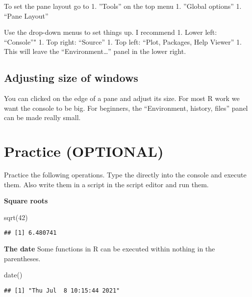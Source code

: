 \documentclass[
]{book}
\newenvironment{Shaded}{\begin{snugshade}}{\end{snugshade}}
\newcommand{\DecValTok}[1]{\textcolor[rgb]{0.00,0.00,0.81}{#1}}
\newcommand{\FunctionTok}[1]{\textcolor[rgb]{0.00,0.00,0.00}{#1}}
\newcommand{\NormalTok}[1]{#1}
\begin{document}
To set the pane layout go to
1. ''Tools'' on the top menu
1. ''Global options''
1. ``Pane Layout''

Use the drop-down menus to set things up. I recommend
1. Lower left: ``Console''"
1. Top right: ``Source''
1. Top left: ``Plot, Packages, Help Viewer''
1. This will leave the ``Environment\ldots{}'' panel in the lower right.

\hypertarget{adjusting-size-of-windows}{%
\subsection{Adjusting size of windows}\label{adjusting-size-of-windows}}

You can clicked on the edge of a pane and adjust its size. For most R work we want the console to be big. For beginners, the ``Environment, history, files'' panel can be made really small.

\hypertarget{practice-optional}{%
\section{Practice (OPTIONAL)}\label{practice-optional}}

Practice the following operations. Type the directly into the console and execute them. Also write them in a script in the script editor and run them.

\textbf{Square roots}

\begin{Shaded}
\begin{Highlighting}[]
\FunctionTok{sqrt}\NormalTok{(}\DecValTok{42}\NormalTok{)}
\end{Highlighting}
\end{Shaded}

\begin{verbatim}
## [1] 6.480741
\end{verbatim}

\textbf{The date}
Some functions in R can be executed within nothing in the parentheses.

\begin{Shaded}
\begin{Highlighting}[]
\FunctionTok{date}\NormalTok{()}
\end{Highlighting}
\end{Shaded}

\begin{verbatim}
## [1] "Thu Jul  8 10:15:44 2021"
\end{verbatim}
\end{document}
